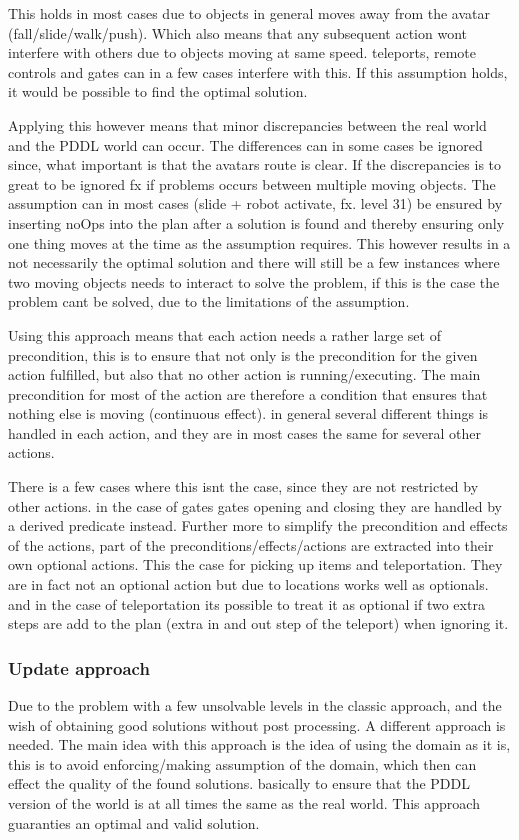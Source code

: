 		This holds in most cases due to objects in general moves away from the avatar (fall/slide/walk/push). Which also means that any subsequent action wont interfere with others due to objects moving at same speed. teleports, remote controls and gates can in a few cases interfere with this. If this assumption holds, it would be possible to find the optimal solution.
		
		Applying this however means that minor discrepancies between the real world and the PDDL world can occur. The differences can in some cases be ignored since, what important is that the avatars route is clear. If the discrepancies is to great to be ignored fx if problems occurs between multiple moving objects. The assumption can in most cases (slide + robot activate, fx. level 31) be ensured by inserting noOps into the plan after a solution is found and thereby ensuring only one thing moves at the time as the assumption requires. This however results in a not necessarily the optimal solution and there will still be a few instances where two moving objects needs to interact to solve the problem, if this is the case the problem cant be solved, due to the limitations of the assumption.
			
		Using this approach means that each action needs a rather large set of precondition, this is to ensure that not only is the precondition for the given action fulfilled, but also that no other action is running/executing. The main precondition for most of the action are therefore a condition that ensures that nothing else is moving (continuous effect). in general several different things is handled in each action, and they are in most cases the same for several other actions. %
		
		There is a few cases where this isnt the case, since they are not restricted by other actions. in the case of gates gates opening and closing they are handled by a derived predicate instead. 
		Further more to simplify the precondition and effects of the actions, part of the preconditions/effects/actions are extracted into their own optional actions. This the case for picking up items and teleportation. They are in fact not an optional action but due to locations works well as optionals. and in the case of teleportation its possible to treat it as optional if two extra steps are add to the plan (extra in and out step of the teleport) when ignoring it.
		
		\subsubsection{Update approach}
		Due to the problem with a few unsolvable levels in the classic approach, and the wish of obtaining good solutions without post processing. A different approach is needed. The main idea with this approach is the idea of using the domain as it is, this is to avoid enforcing/making assumption of the domain, which then can effect the quality of the found solutions. basically to ensure that the PDDL version of the world is at all times the same as the real world. This approach guaranties an optimal and valid solution.
		
